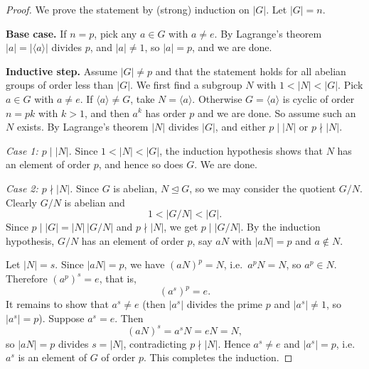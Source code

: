 \documentclass[11pt,a4paper]{article}
\begin{document}
	\begin{proof}
		We prove the statement by (strong) induction on $|G|$. Let $|G| = n$.
		
		\vspace{0.5em}
		\noindent \textbf{Base case.} If $n = p$, pick any $a \in G$ with $a \neq e$. By Lagrange's theorem $|a| = |\langle a \rangle|$ divides $p$, and $|a| \neq 1$, so $|a| = p$, and we are done.
		
		\vspace{0.5em}
		\noindent \textbf{Inductive step.} Assume $|G| \neq p$ and that the statement holds for all abelian groups of order less than $|G|$. We first find a subgroup $N$ with $1 < |N| < |G|$. Pick $a \in G$ with $a \neq e$. If $\langle a \rangle \neq G$, take $N = \langle a \rangle$. Otherwise $G = \langle a \rangle$ is cyclic of order $n = pk$ with $k > 1$, and then $a^{k}$ has order $p$ and we are done. So assume such an $N$ exists. By Lagrange's theorem $|N|$ divides $|G|$, and either $p \mid |N|$ or $p \nmid |N|$.
		
		\vspace{0.5em}
		\noindent \emph{Case 1: $p \mid |N|$.} Since $1 < |N| < |G|$, the induction hypothesis shows that $N$ has an element of order $p$, and hence so does $G$. We are done.
		
		\vspace{0.5em}
		\noindent \emph{Case 2: $p \nmid |N|$.} Since $G$ is abelian, $N \trianglelefteq G$, so we may consider the quotient $G/N$. Clearly $G/N$ is abelian and
		\[
		1 < |G/N| < |G|.
		\]
		Since $p \mid |G| = |N|\,|G/N|$ and $p \nmid |N|$, we get $p \mid |G/N|$. By the induction hypothesis, $G/N$ has an element of order $p$, say $aN$ with $|aN| = p$ and $a \notin N$.
		
		\vspace{0.5em}
		\noindent Let $|N| = s$. Since $|aN| = p$, we have $(aN)^p = N$, i.e.\ $a^p N = N$, so $a^p \in N$. Therefore $(a^p)^s = e$, that is,
		\[
		(a^s)^p = e.
		\]
		It remains to show that $a^s \neq e$ (then $|a^s|$ divides the prime $p$ and $|a^s| \neq 1$, so $|a^s| = p$). Suppose $a^s = e$. Then
		\[
		(aN)^s = a^s N = eN = N,
		\]
		so $|aN| = p$ divides $s = |N|$, contradicting $p \nmid |N|$. Hence $a^s \neq e$ and $|a^s| = p$, i.e.\ $a^s$ is an element of $G$ of order $p$. This completes the induction.
	\end{proof}
	
\end{document}
